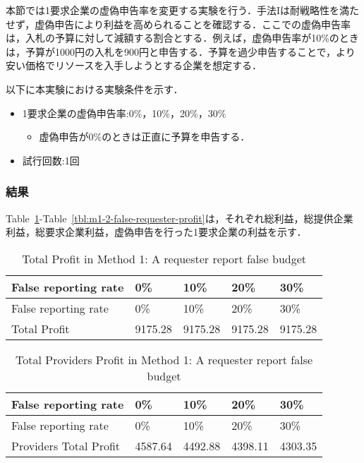 本節では1要求企業の虚偽申告率を変更する実験を行う．手法Iは耐戦略性を満たせず，虚偽申告により利益を高められることを確認する．ここでの虚偽申告率は，入札の予算に対して減額する割合とする．例えば，虚偽申告率が10\%のときは，予算が1000円の入札を900円と申告する．予算を過少申告することで，より安い価格でリソースを入手しようとする企業を想定する．

以下に本実験における実験条件を示す．

\begin{itemize}
\tightlist
\item
  1要求企業の虚偽申告率:0\%，10\%，20\%，30\%

  \begin{itemize}
  \tightlist
  \item
    虚偽申告が0\%のときは正直に予算を申告する．
  \end{itemize}
\item
  試行回数:1回
\end{itemize}

\hypertarget{ux7d50ux679c}{%
\subsubsection{結果}\label{ux7d50ux679c}}

Table~\ref{tbl:m1-2-total-profit}-Table~\ref{tbl:m1-2-false-requester-profit}は，それぞれ総利益，総提供企業利益，総要求企業利益，虚偽申告を行った1要求企業の利益を示す．

\hypertarget{tbl:m1-2-total-profit}{}
\begin{longtable}[H]{@{}lllll@{}}
\caption{\label{tbl:m1-2-total-profit}Total Profit in Method 1: A
requester report false budget}\tabularnewline
\toprule
False reporting rate & 0\% & 10\% & 20\% & 30\%\tabularnewline
\midrule
\endfirsthead
\toprule
False reporting rate & 0\% & 10\% & 20\% & 30\%\tabularnewline
\midrule
\endhead
Total Profit & 9175.28 & 9175.28 & 9175.28 & 9175.28\tabularnewline
\bottomrule
\end{longtable}

\hypertarget{tbl:m1-2-providers-total-profit}{}
\begin{longtable}[H]{@{}lllll@{}}
\caption{\label{tbl:m1-2-providers-total-profit}Total Providers Profit
in Method 1: A requester report false budget}\tabularnewline
\toprule
False reporting rate & 0\% & 10\% & 20\% & 30\%\tabularnewline
\midrule
\endfirsthead
\toprule
False reporting rate & 0\% & 10\% & 20\% & 30\%\tabularnewline
\midrule
\endhead
Providers Total Profit & 4587.64 & 4492.88 & 4398.11 &
4303.35\tabularnewline
\bottomrule
\end{longtable}

